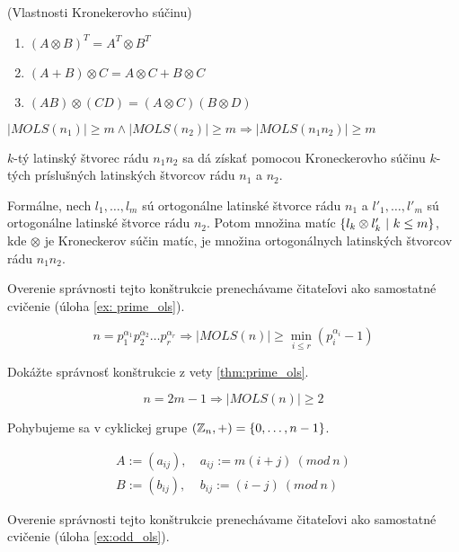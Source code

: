 \begin{theorem_hard}{(Vlastnosti Kronekerovho súčinu)}
\label{th:kr_formulas}
\begin{enumerate}
    \item $(A \otimes B)^T = A^T \otimes B^T$
    \item $(A + B) \otimes C = A \otimes C + B \otimes C$
    \item $(A B) \otimes (C D) = (A \otimes C)(B \otimes D)$
\end{enumerate}
\end{theorem_hard}

\begin{theorem}
\label{thm:prime_ols}
$|MOLS(n_1)| \geq m \wedge |MOLS(n_2)| \geq m \Rightarrow |MOLS(n_1 n_2)| \geq m$
\end{theorem}

\begin{construction}
$k$-tý latinský štvorec rádu $n_1 n_2$ sa dá získať pomocou Kroneckerovho súčinu $k$-tých príslušných latinských štvorcov rádu $n_1$ a $n_2$.

Formálne, nech $l_1, \ldots, l_m$ sú ortogonálne latinské štvorce rádu $n_1$ a $l'_1, \ldots, l'_m$ sú ortogonálne latinské štvorce rádu $n_2$.
Potom množina matíc $\left\{l_k \otimes l'_k ~|~ k \leq m\right\}$, kde $\otimes$ je Kroneckerov súčin matíc, je množina ortogonálnych latinských štvorcov rádu $n_1 n_2$.

Overenie správnosti tejto konštrukcie prenechávame čitateľovi ako samostatné cvičenie (úloha \ref{ex: prime_ols}).
\end{construction}

\begin{corollary}
$$n = p_1^{\alpha_1} p_2^{\alpha_2} \ldots p_r^{\alpha_r} \Rightarrow |MOLS(n)| \geq \min_{i \leq r} (p_i^{\alpha_i} - 1)$$
\end{corollary}


\begin{exercise}
\label{ex: prime_ols}
Dokážte správnosť konštrukcie z vety \ref{thm:prime_ols}.
\end{exercise}


\begin{theorem}
\label{thm:odd_ols}
$$n = 2m - 1 \Rightarrow |MOLS(n)| \geq 2$$
\end{theorem}

\begin{construction}

Pohybujeme sa v cyklickej grupe $(\mathbb{Z}_n, +) = \left\{0, \ldots, n-1\right\}$.

\begin{align*}
A := (a_{ij}),~& a_{ij} := m (i+j)~(mod~n) \\
B := (b_{ij}),~& b_{ij} := (i-j)  ~(mod~n)    
\end{align*}

Overenie správnosti tejto konštrukcie prenechávame čitateľovi ako samostatné cvičenie (úloha \ref{ex:odd_ols}).
\end{construction}


